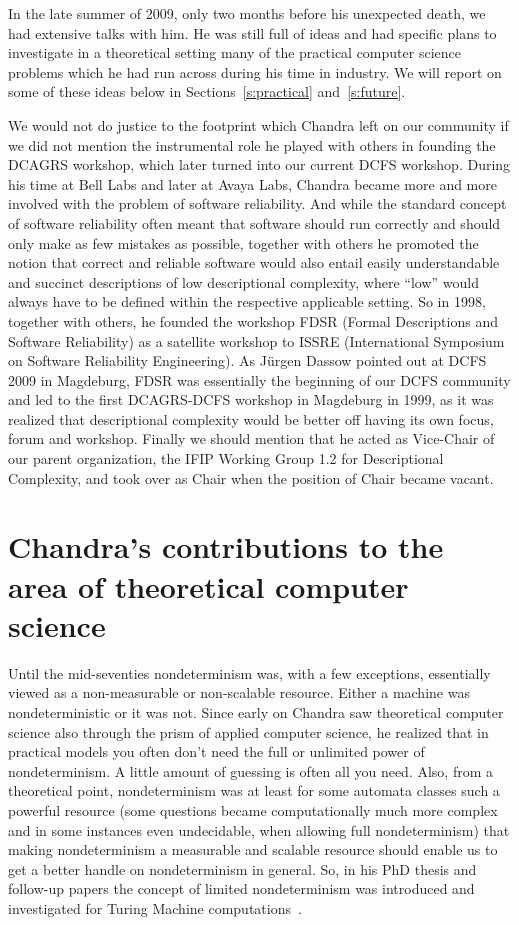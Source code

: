\documentclass[copyright]{eptcs}
\begin{document}
In the late summer of 2009, only two months before his unexpected death, we had extensive talks with him. He was still 
full of ideas and had specific plans to investigate in a theoretical setting many of the practical computer science 
problems which he had run across during his time in industry. We will report on some of these ideas below in
Sections~\ref{s:practical} and~\ref{s:future}.

We would not do justice to the footprint which Chandra left on our community if we did not mention the instrumental role he played with 
others in founding the DCAGRS workshop,
which later turned into our current DCFS workshop. 
During his time at Bell Labs and later 
at Avaya Labs, Chandra became more and more 
involved with the problem of software reliability. 
And while the standard concept of software reliability 
often meant that software should run correctly and 
should only make  as few mistakes as possible, 
together with others he promoted the notion that 
correct and reliable software would also entail 
easily understandable and succinct descriptions 
of low descriptional complexity, where ``low'' 
would always have to be  defined within 
the respective applicable setting. So in 1998, together with others, 
he founded the workshop FDSR (Formal Descriptions and 
Software Reliability) as a satellite workshop to ISSRE 
(International Symposium on Software Reliability Engineering). 
As J{\"u}rgen Dassow pointed out at DCFS 2009 in Magdeburg, 
FDSR was essentially the beginning of our DCFS community and 
led to the first DCAGRS-DCFS workshop in Magdeburg in 
1999, as it was realized that descriptional complexity would 
be better off having its own focus, forum and workshop. 
Finally we should mention that he acted as Vice-Chair of our parent organization, the IFIP Working Group 1.2 for 
Descriptional Complexity, and took over as Chair when the position of Chair became vacant.

\section{Chandra's contributions to the area of theoretical computer science}\label{s:tcs}

Until the mid-seventies nondeterminism was, with a few exceptions, essentially viewed as a non-measur\-able or non-scalable resource. 
Either a machine was nondeterministic or it was not. Since early on Chandra saw theoretical computer science also through the prism 
of applied computer science, he realized that in practical models you often don't need the full or unlimited power of nondeterminism. 
A little amount of guessing is often all you need. Also, from a theoretical point, nondeterminism was at least for some automata classes 
such a powerful resource (some questions became computationally much more complex and in some instances even undecidable, when allowing 
full nondeterminism) that making nondeterminism a measurable and scalable resource should enable us to get a better handle on 
nondeterminism in general. So, in his PhD thesis and follow-up papers the concept of limited nondeterminism was introduced and investigated
for Turing Machine computations~\cite{FischerK78,KintalaF77,KintalaF80}. 
\end{document}
